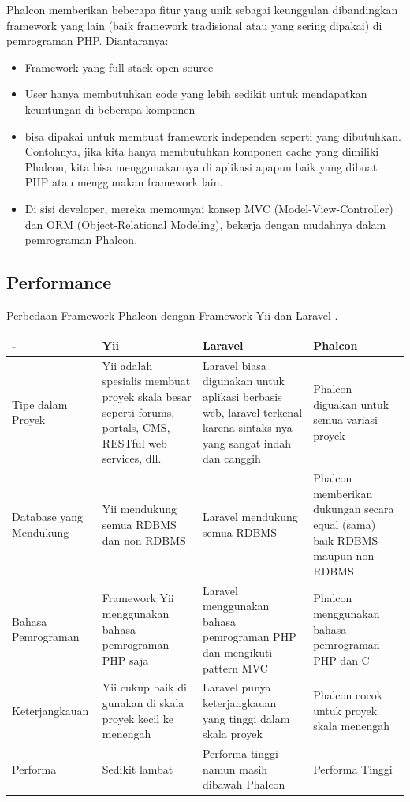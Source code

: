 \documentclass{wileySix}
\begin{document}
Phalcon memberikan beberapa fitur yang unik sebagai keunggulan dibandingkan framework yang lain (baik framework tradisional atau yang sering dipakai) di pemrograman PHP. Diantaranya:

\begin{itemize}
 \item Framework yang full-stack open source

 \item User hanya membutuhkan code yang lebih sedikit untuk mendapatkan keuntungan di beberapa komponen

 \item bisa dipakai untuk membuat framework independen seperti yang dibutuhkan. Contohnya, jika kita hanya membutuhkan komponen cache yang dimiliki Phalcon, kita bisa menggunakannya di aplikasi apapun baik yang dibuat PHP atau menggunakan framework lain.

 \item Di sisi developer, mereka memounyai konsep MVC (Model-View-Controller) dan ORM (Object-Relational Modeling), bekerja dengan mudahnya dalam pemrograman Phalcon.
 \end{itemize}

\subsection{Performance}

Perbedaan Framework Phalcon dengan Framework Yii dan Laravel \cite{prokofyeva2017analysis}.

\begin{center}
 \begin{tabular}{ | m{2em} | m{3cm}| m{3cm} | m{3cm} }
 \hline
 - & Yii & Laravel & Phalcon \\ [0.5ex]
 \hline\hline
 Tipe dalam Proyek & Yii adalah spesialis membuat proyek skala besar seperti forums, portals, CMS, RESTful web services, dll. & Laravel biasa digunakan untuk aplikasi berbasis web, laravel terkenal karena sintaks nya yang sangat indah dan canggih & Phalcon diguakan untuk semua variasi proyek \\
 \hline
 Database yang Mendukung & Yii mendukung semua RDBMS dan non-RDBMS & Laravel mendukung semua RDBMS & Phalcon memberikan dukungan secara equal (sama) baik RDBMS maupun non-RDBMS \\
 \hline
 Bahasa Pemrograman & Framework Yii menggunakan bahasa pemrograman PHP saja & Laravel menggunakan bahasa pemrograman PHP dan mengikuti pattern MVC & Phalcon menggunakan bahasa pemrograman PHP dan C \\
 \hline
 Keterjangkauan & Yii cukup baik di gunakan di skala proyek kecil ke menengah & Laravel punya keterjangkauan yang tinggi dalam skala proyek & Phalcon cocok untuk proyek skala menengah \\
 \hline
 Performa & Sedikit lambat & Performa tinggi namun masih dibawah Phalcon & Performa Tinggi \\ [1ex]
 \hline
\end{tabular}
\end{center}
\end{document}
